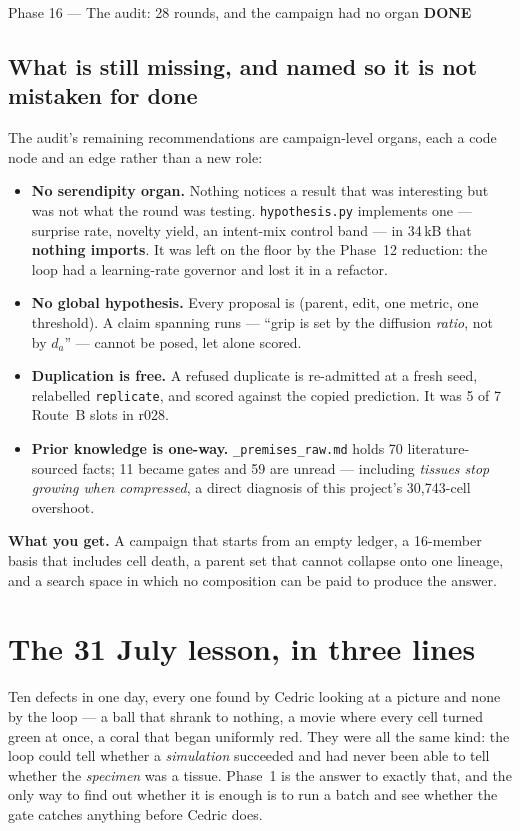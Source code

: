 \documentclass[11pt,a4paper]{article}
\newcommand{\code}[1]{\texttt{#1}}
\newcommand{\done}{\textcolor{good}{\textbf{DONE}}}
\begin{document}
\begin{phasebox}{Phase 16 --- The audit: 28 rounds, and the campaign had no organ \hfill \done}
\subsection*{What is still missing, and named so it is not mistaken for done}
The audit's remaining recommendations are campaign-level organs, each a code node and an edge
rather than a new role:
\begin{itemize}[leftmargin=1.4em]
\item \textbf{No serendipity organ.} Nothing notices a result that was interesting but was not what
the round was testing. \code{hypothesis.py} implements one --- surprise rate, novelty yield, an
intent-mix control band --- in 34\,kB that \textbf{nothing imports}. It was left on the floor by the
Phase~12 reduction: the loop had a learning-rate governor and lost it in a refactor.
\item \textbf{No global hypothesis.} Every proposal is (parent, edit, one metric, one threshold). A
claim spanning runs --- ``grip is set by the diffusion \emph{ratio}, not by $d_a$'' --- cannot be
posed, let alone scored.
\item \textbf{Duplication is free.} A refused duplicate is re-admitted at a fresh seed, relabelled
\code{replicate}, and scored against the copied prediction. It was 5 of 7 Route~B slots in r028.
\item \textbf{Prior knowledge is one-way.} \code{\_premises\_raw.md} holds 70 literature-sourced
facts; 11 became gates and 59 are unread --- including \emph{tissues stop growing when compressed},
a direct diagnosis of this project's 30{,}743-cell overshoot.
\end{itemize}

\textbf{What you get.} A campaign that starts from an empty ledger, a 16-member basis that includes
cell death, a parent set that cannot collapse onto one lineage, and a search space in which no
composition can be paid to produce the answer.
\end{phasebox}

\section{The 31 July lesson, in three lines}

Ten defects in one day, every one found by Cedric looking at a picture and none by the loop --- a
ball that shrank to nothing, a movie where every cell turned green at once, a coral that began
uniformly red. They were all the same kind: the loop could tell whether a \emph{simulation}
succeeded and had never been able to tell whether the \emph{specimen} was a tissue. Phase~1 is the
answer to exactly that, and the only way to find out whether it is enough is to run a batch and see
whether the gate catches anything before Cedric does.
\end{document}
